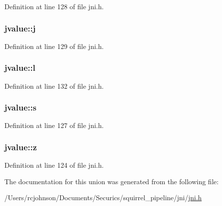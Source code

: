 Definition at line 128 of file jni.\-h.

\hypertarget{unionjvalue_a689d7d90535c58396fea6fe01eae4a16}{
\subsubsection[{j}]{ jvalue\-::j}}\label{unionjvalue_a689d7d90535c58396fea6fe01eae4a16}


Definition at line 129 of file jni.\-h.

\hypertarget{unionjvalue_a39641ea6a8d530886f307f23eabcc2c8}{
\subsubsection[{l}]{ jvalue\-::l}}\label{unionjvalue_a39641ea6a8d530886f307f23eabcc2c8}


Definition at line 132 of file jni.\-h.

\hypertarget{unionjvalue_a14b30561ffa7cec1d3816fbcfad9cc37}{
\subsubsection[{s}]{ jvalue\-::s}}\label{unionjvalue_a14b30561ffa7cec1d3816fbcfad9cc37}


Definition at line 127 of file jni.\-h.

\hypertarget{unionjvalue_a05012aacf042aed275b99751d3498db6}{
\subsubsection[{z}]{ jvalue\-::z}}\label{unionjvalue_a05012aacf042aed275b99751d3498db6}


Definition at line 124 of file jni.\-h.



The documentation for this union was generated from the following file\-:\begin{DoxyCompactItemize}
\item 
/\-Users/rcjohnson/\-Documents/\-Securics/squirrel\-\_\-pipeline/jni/\hyperlink{jni_8h}{jni.\-h}\end{DoxyCompactItemize}
